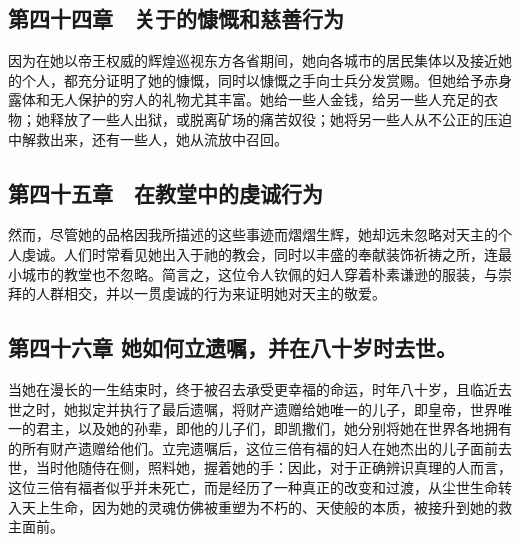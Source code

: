 
\subsection{第四十四章　关于的慷慨和慈善行为}

因为在她以帝王权威的辉煌巡视东方各省期间，她向各城市的居民集体以及接近她的个人，都充分证明了她的慷慨，同时以慷慨之手向士兵分发赏赐。但她给予赤身露体和无人保护的穷人的礼物尤其丰富。她给一些人金钱，给另一些人充足的衣物；她释放了一些人出狱，或脱离矿场的痛苦奴役；她将另一些人从不公正的压迫中解救出来，还有一些人，她从流放中召回。\par


\subsection{第四十五章　在教堂中的虔诚行为}

然而，尽管她的品格因我所描述的这些事迹而熠熠生辉，她却远未忽略对天主的个人虔诚。人们时常看见她出入于祂的教会，同时以丰盛的奉献装饰祈祷之所，连最小城市的教堂也不忽略。简言之，这位令人钦佩的妇人穿着朴素谦逊的服装，与崇拜的人群相交，并以一贯虔诚的行为来证明她对天主的敬爱。\par


\subsection{第四十六章 她如何立遗嘱，并在八十岁时去世。}

当她在漫长的一生结束时，终于被召去承受更幸福的命运，时年八十岁，且临近去世之时，她拟定并执行了最后遗嘱，将财产遗赠给她唯一的儿子，即皇帝，世界唯一的君主，以及她的孙辈，即他的儿子们，即凯撒们，她分别将她在世界各地拥有的所有财产遗赠给他们。立完遗嘱后，这位三倍有福的妇人在她杰出的儿子面前去世，当时他随侍在侧，照料她，握着她的手：因此，对于正确辨识真理的人而言，这位三倍有福者似乎并未死亡，而是经历了一种真正的改变和过渡，从尘世生命转入天上生命，因为她的灵魂仿佛被重塑为不朽的、天使般的本质，被接升到她的救主面前。\par


